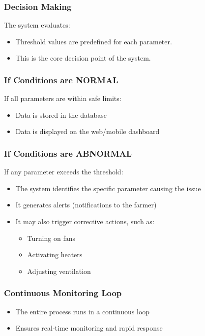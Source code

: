 \documentclass[../main.tex]{subfiles}
\begin{document}
\subsubsection{Decision Making}
The system evaluates:
\begin{itemize}
    \item Threshold values are predefined for each parameter.
    \item This is the core decision point of the system.
\end{itemize}

\subsubsection{If Conditions are NORMAL}
If all parameters are within safe limits:
\begin{itemize}
    \item Data is stored in the database
    \item Data is displayed on the web/mobile dashboard
\end{itemize}

\subsubsection{If Conditions are ABNORMAL}
If any parameter exceeds the threshold:
\begin{itemize}
    \item The system identifies the specific parameter causing the issue
    \item It generates alerts (notifications to the farmer)
    \item It may also trigger corrective actions, such as:
\begin{itemize}
    \item Turning on fans
     \item Activating heaters
      \item Adjusting ventilation
\end{itemize}
\end{itemize}

\subsubsection{Continuous Monitoring Loop}
\begin{itemize}
    \item The entire process runs in a continuous loop
    \item Ensures real-time monitoring and rapid response
\end{itemize}

    
\newpage
\end{document}

